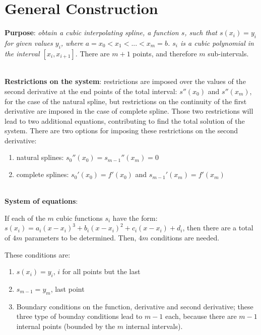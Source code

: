 \documentclass[paper=a4, fontsize=11pt]{scrartcl} %
\numberwithin{equation}{section} %
\numberwithin{figure}{section} %
\numberwithin{table}{section} %
\begin{document}
\section{General Construction}

\textbf{Purpose}: \textit{obtain a cubic interpolating spline, a function $s$, such that $s(x_{i}) = y_{i}$ for given values $y_{i}$, where $a=x_{0}<x_{1}<...<x_{m}=b$. $s_{i}$ is a cubic polynomial in the interval $[x_{i}, x_{i+1}]$}. There are $m+1$ points, and therefore $m$ sub-intervals.

\ \\

\textbf{Restrictions on the system}: restrictions are imposed over the values of the second derivative at the end points of the total interval: $s''(x_{0})$ and $s''(x_{m})$, for the case of the natural spline, but restrictions on the continuity of the first derivative are imposed in the case of complete spline. Those two restrictions will lead to two additional equations, contributing to find the total solution of the system. There are two options for imposing these restrictions on the second derivative:

\begin{enumerate}
\item natural splines: $s_{0}''(x_{0}) = s_{m-1}''(x_{m}) = 0$
\item complete splines: $s_{0}'(x_{0}) = f'(x_{0})$ and $s_{m-1}'(x_{m}) = f'(x_{m})$
\end{enumerate}

\ \\

\textbf{System of equations}: 

If each of the $m$ cubic functions $s_{i}$ have the form: $s(x_{i}) = a_{i}(x-x_{i})^3 + b_{i}(x-x_{i})^2 + c_{i}(x-x_{i}) + d_{i}$, then there are a total of $4m$ parameters to be determined. Then, $4m$ conditions are needed.

These conditions are:

\begin{enumerate}
\item $s(x_{i}) = y_{i}$, \quad \quad $i$ for all points but the last
\item $s_{m-1} = y_{m}$, \quad \quad last point
\item Boundary conditions on the function, derivative and second derivative; these three type of bounday conditions lead to $m-1$ each, because there are $m-1$ internal points (bounded by the $m$ internal intervals).
\end{enumerate}
\end{document}
